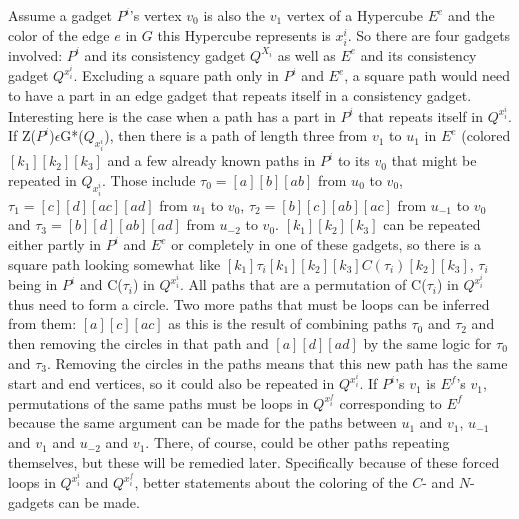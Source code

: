 \documentclass[12pt,a4paper]{article}
\begin{document}
Assume a gadget $P^i$'s vertex $v_0$ is also the $v_1$ vertex of a Hypercube $E^e$ and the color of the edge $e$ in $G$ this Hypercube represents is $x^i_i$. So there are four gadgets involved: $P^i$ and its consistency gadget $Q^{X_i}$ as well as $E^e$ and its consistency gadget $Q^{x^i_i}$. Excluding a square path only in $P^i$ and $E^e$, a square path would need to have a part in an edge gadget that repeats itself in a consistency gadget. Interesting here is the case when a path has a part in $P^i$ that repeats itself in $Q^{x^i_i}$. If Z($P^i$)$\epsilon$G*($Q_{x^i_i}$), then there is a path of length three from $v_1$ to $u_1$ in $E^e$ (colored $[k_1][k_2][k_3]$ and a few already known paths in $P^i$ to its $v_0$ that might be repeated in $Q_{x^i_i}$. Those include $\tau_0 = [a][b][ab]$ from $u_0$ to $v_0$, $\tau_1 = [c][d][ac][ad]$ from $u_1$ to $v_0$, $\tau_2 = [b][c][ab][ac]$ from $u_{-1}$ to $v_0$ and $\tau_3 = [b][d][ab][ad]$ from $u_{-2}$ to $v_0$. $[k_1][k_2][k_3]$ can be repeated either partly in $P^i$ and $E^e$ or completely in one of these gadgets, so there is a square path looking somewhat like $[k_1]\tau_i[k_1][k_2][k_3]C(\tau_i)[k_2][k_3]$, $\tau_i$ being in $P^i$ and C($\tau_i$) in $Q^{x^i_i}$. All paths that are a permutation of C($\tau_i$) in $Q^{x^i_i}$ thus need to form a circle. Two more paths that must be loops can be inferred from them: $[a][c][ac]$ as this is the result of combining paths $\tau_0$ and $\tau_2$ and then removing the circles in that path and $[a][d][ad]$ by the same logic for $\tau_0$ and $\tau_3$. Removing the circles in the paths means that this new path has the same start and end vertices, so it could also be repeated in $Q^{x_i^i}$. If $P^i$'s $v_1$ is $E^f$'s $v_1$, permutations of the same paths must be loops in $Q^{x^f_i}$ corresponding to $E^f$ because the same argument can be made for the paths between $u_1$ and $v_1$, $u_{-1}$ and $v_1$ and $u_{-2}$ and $v_1$. There, of course, could be other paths repeating themselves, but these will be remedied later. Specifically because of these forced loops in $Q^{x_i^i}$ and $Q^{x^f_i}$, better statements about the coloring of the $C$- and $N$-gadgets can be made. 
\newline
\end{document}
